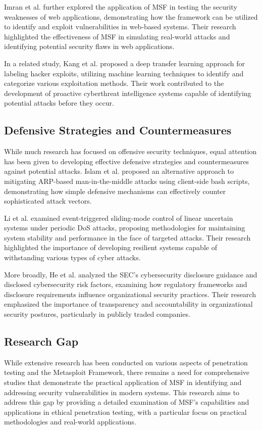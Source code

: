 \documentclass[journal,twoside]{IEEEtran}
\begin{document}
Imran et al. \cite{imran2019} further explored the application of MSF in testing the security weaknesses of web applications, demonstrating how the framework can be utilized to identify and exploit vulnerabilities in web-based systems. Their research highlighted the effectiveness of MSF in simulating real-world attacks and identifying potential security flaws in web applications.

In a related study, Kang et al. \cite{kang2020} proposed a deep transfer learning approach for labeling hacker exploits, utilizing machine learning techniques to identify and categorize various exploitation methods. Their work contributed to the development of proactive cyberthreat intelligence systems capable of identifying potential attacks before they occur.

\subsection{Defensive Strategies and Countermeasures}
While much research has focused on offensive security techniques, equal attention has been given to developing effective defensive strategies and countermeasures against potential attacks. Islam et al. \cite{islam2018} proposed an alternative approach to mitigating ARP-based man-in-the-middle attacks using client-side bash scripts, demonstrating how simple defensive mechanisms can effectively counter sophisticated attack vectors.

Li et al. \cite{li2020} examined event-triggered sliding-mode control of linear uncertain systems under periodic DoS attacks, proposing methodologies for maintaining system stability and performance in the face of targeted attacks. Their research highlighted the importance of developing resilient systems capable of withstanding various types of cyber attacks.

More broadly, He et al. \cite{he2019} analyzed the SEC's cybersecurity disclosure guidance and disclosed cybersecurity risk factors, examining how regulatory frameworks and disclosure requirements influence organizational security practices. Their research emphasized the importance of transparency and accountability in organizational security postures, particularly in publicly traded companies.

\subsection{Research Gap}
While extensive research has been conducted on various aspects of penetration testing and the Metasploit Framework, there remains a need for comprehensive studies that demonstrate the practical application of MSF in identifying and addressing security vulnerabilities in modern systems. This research aims to address this gap by providing a detailed examination of MSF's capabilities and applications in ethical penetration testing, with a particular focus on practical methodologies and real-world applications.
\end{document}
